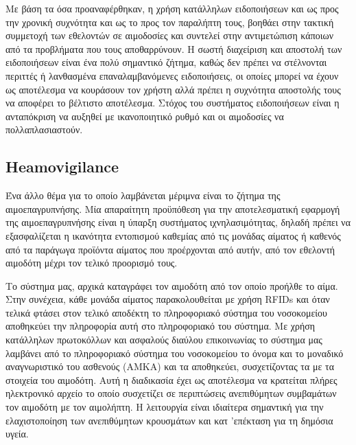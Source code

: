	
		 Με βάση τα όσα προαναφέρθηκαν, η χρήση κατάλληλων ειδοποιήσεων και ως προς την χρονική συχνότητα και ως το προς τον παραλήπτη τους, βοηθάει στην τακτική συμμετοχή των εθελοντών σε αιμοδοσίες και συντελεί στην αντιμετώπιση κάποιων από τα προβλήματα που τους αποθαρρύνουν. Η σωστή διαχείριση και αποστολή των ειδοποιήσεων είναι ένα πολύ σημαντικό ζήτημα, καθώς δεν πρέπει να στέλνονται περιττές ή λανθασμένα επαναλαμβανόμενες ειδοποιήσεις, οι οποίες μπορεί να έχουν ως αποτέλεσμα να κουράσουν τον χρήστη αλλά πρέπει η συχνότητα αποστολής τους να αποφέρει το βέλτιστο αποτέλεσμα. Στόχος του συστήματος ειδοποιήσεων είναι η ανταπόκριση να αυξηθεί με ικανοποιητικό ρυθμό και οι αιμοδοσίες να πολλαπλασιαστούν\cite{Marantidou2007}.
	
	
	\subsection{Heamovigilance}
	
		Ένα άλλο θέμα για το οποίο λαμβάνεται μέριμνα είναι το ζήτημα της αιμοεπαγρυπνήσης. Μία απαραίτητη προϋπόθεση για την αποτελεσματική εφαρμογή της αιμοεπαγρυπνήσης είναι η ύπαρξη συστήματος ιχνηλασιμότητας, δηλαδή πρέπει να εξασφαλίζεται η ικανότητα εντοπισμού καθεμίας από τις μονάδας αίματος ή καθενός από τα παράγωγα προϊόντα αίματος που προέρχονται από αυτήν, από τον εθελοντή αιμοδότη μέχρι τον τελικό προορισμό τους.
		
		
		Το σύστημα μας, αρχικά καταγράφει τον αιμοδότη από τον οποίο προήλθε το αίμα. Στην συνέχεια, κάθε μονάδα αίματος παρακολουθείται με χρήση RFIDs και όταν τελικά φτάσει στον τελικό αποδέκτη το πληροφοριακό σύστημα του νοσοκομείου αποθηκεύει την πληροφορία αυτή στο πληροφοριακό του σύστημα. Με χρήση κατάλληλων πρωτοκόλλων και ασφαλούς διαύλου επικοινωνίας το σύστημα μας λαμβάνει από το πληροφοριακό σύστημα του νοσοκομείου το όνομα και το μοναδικό αναγνωριστικό του ασθενούς (ΑΜΚΑ) και τα αποθηκεύει, συσχετίζοντας τα με τα στοιχεία του αιμοδότη. Αυτή η διαδικασία έχει ως αποτέλεσμα να κρατείται πλήρες ηλεκτρονικό αρχείο το οποίο συσχετίζει σε περιπτώσεις ανεπιθύμητων συμβαμάτων τον αιμοδότη με τον αιμολήπτη. Η λειτουργία είναι ιδιαίτερα σημαντική για την ελαχιστοποίηση των ανεπιθύμητων κρουσμάτων και κατ 'επέκταση για τη δημόσια υγεία.	


	